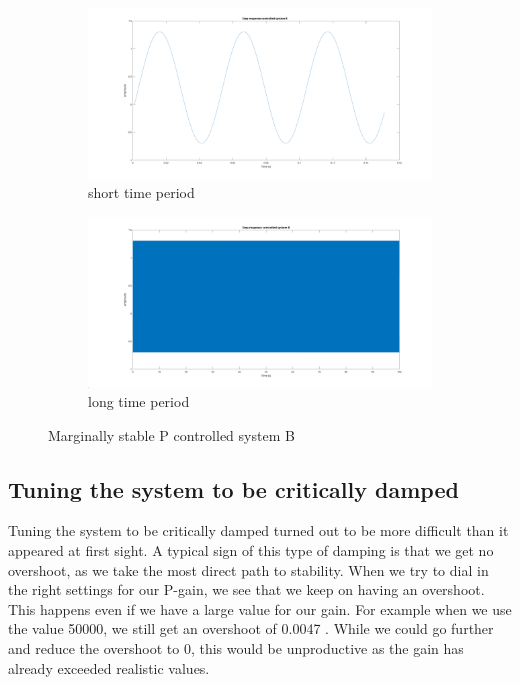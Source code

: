 \documentclass[a4paper,kul]{kulakarticle} %
\begin{document}
			\begin{figure}[h]
				\centering
				\begin{subfigure}{.5\textwidth}
					\centering
					\includegraphics[width=1\linewidth]{stepControlledSystemBShort}
					\caption[step marginal system B short]{short time period}
					\label{fig:stepControlledBShort}
				\end{subfigure}%
				\begin{subfigure}{.5\textwidth}
					\centering
					\includegraphics[width=1\linewidth]{stepControlledSystemBLong}
					\caption[step marginal system B long]{long time period}
					\label{fig:stepControlledBLong}
				\end{subfigure}
				\caption{Marginally stable P controlled system B}
				\label{fig:stepControlledB}
			\end{figure}
			
		\subsection{Tuning the system to be critically damped}
			Tuning the system to be critically damped turned out to be more difficult than it appeared at first sight. A typical sign of this type of damping is that we get no overshoot, as we take the most direct path to stability. When we try to dial in the right settings for our P-gain, we see that we keep on having an overshoot. This happens even if we have a large value for our gain. For example when we use the value \num{50000}, we still get an overshoot of 0.0047 .  While we could go further and reduce the overshoot to 0, this would be unproductive as the gain has already exceeded realistic values. 
	\newpage
\end{document}
